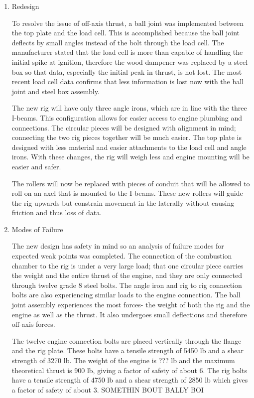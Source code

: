 \documentclass[10pt,a4paper]{article}
\begin{document}
\begin{enumerate}
 	
 	\item Redesign

   To resolve the issue of off-axis thrust, a ball joint was implemented between the top plate and the load cell. This is accomplished because the ball joint deflects by small angles instead of the bolt through the load cell. The manufacturer stated that the load cell is more than capable of handling the initial spike at ignition, therefore the wood dampener was replaced by a steel box so that data, especially the initial peak in thrust, is not lost. The most recent load cell data confirms that less information is lost now with the ball joint and steel box assembly. 

   The new rig will have only three angle irons, which are in line with the three I-beams. This configuration allows for easier access to engine plumbing and connections. The circular pieces will be designed with alignment in mind; connecting the two rig pieces together will be much easier. The top plate is designed with less material and easier attachments to the load cell and angle irons. With these changes, the rig will weigh less and engine mounting will be easier and safer. 

   The rollers will now be replaced with pieces of conduit that will be allowed to roll on an axel that is mounted to the I-beams. These new rollers will guide the rig upwards but constrain movement in the laterally without causing friction and thus loss of data. 


 	\item Modes of Failure
 	
 	The new design has safety in mind so an analysis of failure modes for expected weak points was completed. The connection of the combustion chamber to the rig is under a very large load; that one circular piece carries the weight and the entire thrust of the engine, and they are only connected through twelve grade 8 steel bolts. The angle iron and rig to rig connection bolts are also experiencing similar loads to the engine connection. The ball joint assembly experiences the most forces- the weight of both the rig and the engine as well as the thrust. It also undergoes small deflections and therefore off-axis forces. 

   The twelve engine connection bolts are placed vertically through the flange and the rig plate. These bolts have a tensile strength of 5450 lb and a shear strength of 3270 lb. The weight of the engine is ??? lb and the maximum theoretical thrust is 900 lb, giving a factor of safety of about 6. The rig bolts have a tensile strength of 4750 lb and a shear strength of 2850 lb which gives a factor of safety of about 3. SOMETHIN BOUT BALLY BOI


\end{enumerate}
\end{document}
